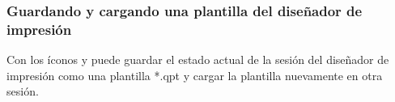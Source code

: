 \subsubsection{Guardando y cargando una plantilla del diseñador de impresión}

Con los íconos  y
 puede guardar el estado actual
de la sesión del diseñador de impresión como una  plantilla *.qpt y cargar la plantilla
nuevamente en otra sesión.


